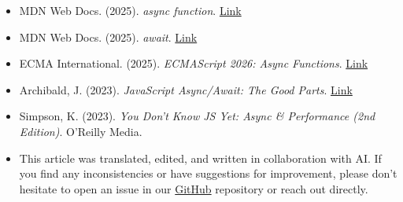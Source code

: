 \documentclass[12pt,letterpaper]{article}
\begin{document}
\begin{itemize}
    \item MDN Web Docs. (2025). \textit{async function}. \href{https://developer.mozilla.org/en-US/docs/Web/JavaScript/Reference/Statements/async_function}{Link}
    
    \item MDN Web Docs. (2025). \textit{await}. \href{https://developer.mozilla.org/en-US/docs/Web/JavaScript/Reference/Operators/await}{Link}
    
    \item ECMA International. (2025). \textit{ECMAScript 2026: Async Functions}. \href{https://tc39.es/ecma262/#sec-async-function-definitions}{Link}
    
    \item Archibald, J. (2023). \textit{JavaScript Async/Await: The Good Parts}. \href{https://web.dev/articles/async-functions}{Link}
    
    \item Simpson, K. (2023). \textit{You Don't Know JS Yet: Async \& Performance (2nd Edition)}. O'Reilly Media.

    \item This article was translated, edited, and written in collaboration with AI. If you find any inconsistencies or have suggestions for improvement, please don't hesitate to open an issue in our \href{https://github.com/asanchezyali/social-media-posts}{GitHub} repository or reach out directly.
\end{itemize}
\end{document}
